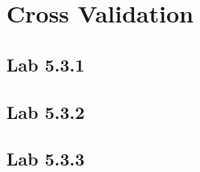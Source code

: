 \chapter{Cross Validation}
\label{chp:crossval}

\section{Lab 5.3.1}
\section{Lab 5.3.2}
\section{Lab 5.3.3}